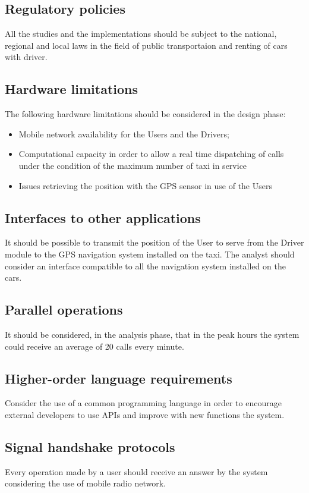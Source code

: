 \documentclass[12pt,a4paper]{book}
\begin{document}
			\subsection{Regulatory policies}
			All the studies and the implementations should be subject to the national, regional and local laws in the field of public transportaion and renting of cars with driver.
			\subsection{Hardware limitations}
			The following hardware limitations should be considered in the design phase:
			\begin{itemize}
				\item[\textbullet] Mobile network availability for the Users and the Drivers;
				\item[\textbullet] Computational capacity in order to allow a real time dispatching of calls under the condition of the maximum number of taxi in service
				\item[\textbullet] Issues retrieving the position with the GPS sensor in use of the Users
			\end{itemize}
			\subsection{Interfaces to other applications}
			It should be possible to transmit the position of the User to serve from the Driver module to the GPS navigation system installed on the taxi. The analyst should consider an interface compatible to all the navigation system installed on the cars.
			\subsection{Parallel operations}
			It should be considered, in the analysis phase, that in the peak hours the system could receive an average of 20 calls every minute.
			\subsection{Higher-order language requirements}
			Consider the use of a common programming language in order to encourage external developers to use APIs and improve with new functions the system.
			\subsection{Signal handshake protocols}
			Every operation made by a user should receive an answer by the system considering the use of mobile radio network.
\end{document}
